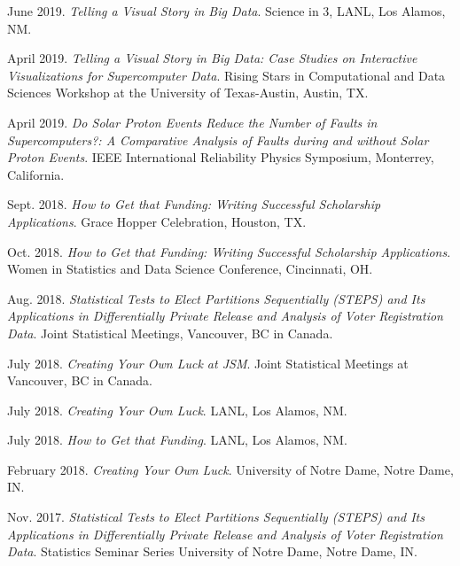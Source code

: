 \begin{etaremune}[topsep=0pt, itemsep=2.5pt, partopsep=0pt, parsep=0pt]
    \item June 2019. \textit{Telling a Visual Story in Big Data}. Science in 3, LANL, Los Alamos, NM. 
    
    \item April 2019. \textit{Telling a Visual Story in Big Data: Case Studies on Interactive Visualizations for Supercomputer Data}. Rising Stars in Computational and Data Sciences Workshop at the University of Texas-Austin, Austin, TX.
    
    \item April 2019. \textit{Do Solar Proton Events Reduce the Number of Faults in Supercomputers?: A Comparative Analysis of Faults during and without Solar Proton Events}. IEEE International Reliability Physics Symposium, Monterrey, California.
    
    \item Sept. 2018. \textit{How to Get that Funding: Writing Successful Scholarship Applications}. Grace Hopper Celebration, Houston, TX.
    
    \item Oct. 2018. \textit{How to Get that Funding: Writing Successful Scholarship Applications}. Women in Statistics and Data Science Conference, Cincinnati, OH.
    
    \item Aug. 2018. \textit{Statistical Tests to Elect Partitions Sequentially (STEPS) and Its Applications in Differentially Private Release and Analysis of Voter Registration Data}. Joint Statistical Meetings, Vancouver, BC in Canada.
    
    \item July 2018. \textit{Creating Your Own Luck at JSM}. Joint Statistical Meetings at Vancouver, BC in Canada.
    
    \item July 2018. \textit{Creating Your Own Luck}. LANL, Los Alamos, NM.
    
    \item July 2018. \textit{How to Get that Funding}. LANL, Los Alamos, NM.
    
    \item February 2018. \textit{Creating Your Own Luck}. University of Notre Dame, Notre Dame, IN.
    
    \item Nov. 2017. \textit{Statistical Tests to Elect Partitions Sequentially (STEPS) and Its Applications in Differentially Private Release and Analysis of Voter Registration Data}. Statistics Seminar Series University of Notre Dame, Notre Dame, IN.
    

\end{etaremune}
